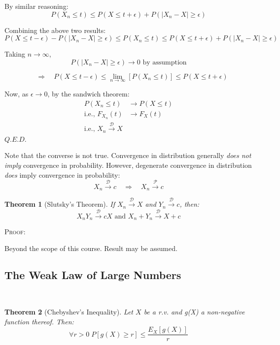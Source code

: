 \documentclass[12pt,a4paper]{article}
\newcommand{\imply}{\quad\Rightarrow\quad}
\newtheorem{thm}{Theorem}[subsection]
\begin{document}
By similar reasoning:
$$P(X_n\leq t) \leq P(X\leq t+\epsilon)+P(\left|X_n-X\right|\geq \epsilon)$$

Combining the above two results:
$$P(X\leq t-\epsilon) - P(\left|X_n-X\right|\geq \epsilon) \leq P(X_n\leq t) \leq P(X\leq t+\epsilon)+P(\left|X_n-X\right|\geq \epsilon)$$

Taking $n\to\infty$,
$$P(\left|X_n-X\right|\geq \epsilon)\to 0 \mbox{ by assumption}$$

$$\imply P(X\leq t-\epsilon) \leq \lim_{n\to\infty}\left[P(X_n\leq t)\right] \leq P(X\leq t+\epsilon)$$

Now, as $\epsilon\to 0$, by the sandwich theorem:
\begin{align*}
P(X_n\leq t) &\to P(X\leq t)\\
\text{i.e., } F_{X_n}(t) &\to F_X(t)\\
\text{i.e., } X_n \xrightarrow{\mathscr{D}} X
\end{align*}\hfill$Q.E.D.$\par\vspace{1cm}

Note that the converse is not true. Convergence in distribution generally \emph{does not imply} convergence in probability. However, degenerate convergence in distribution \emph{does} imply convergence in probability:
$$X_n\xrightarrow{\mathscr{D}} c \imply X_n \xrightarrow{\mathscr{P}} c$$

\begin{thm}[Slutsky's Theorem]\vspace{1cm}

If $X_n\xrightarrow{\mathscr{D}} X$ and $Y_n\xrightarrow{\mathscr{D}}c$, then:
$$X_nY_n\xrightarrow{\mathscr{D}} cX \mbox{ and } X_n+Y_n\xrightarrow{\mathscr{D}} X+c$$

\end{thm}

\noindent\textsc{Proof:}\par\vspace{1cm}

Beyond the scope of this course. Result may be assumed.\par\vspace{1cm}

\subsection{The Weak Law of Large Numbers}$\;$

\begin{thm}[Chebyshev's Inequality]\vspace{1cm}

Let $X$ be a r.v. and g(X) a non-negative function thereof. Then:
$$\forall r>0\; P\left[g(X)\geq r\right] \leq \frac{E_X\left[g(X)\right]}{r}$$

\end{thm}
\end{document}
